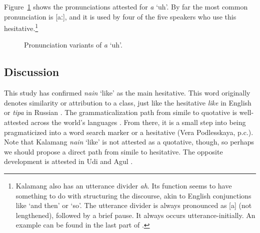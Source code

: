 \documentclass[output=paper,colorlinks,citecolor=brown
\ChapterDOI{10.5281/zenodo.15697587}
]{langscibook}
\begin{document}
Figure~\ref{fig:hesehpron} shows the pronunciations attested for \textit{a} `uh'. By far the most common pronunciation is [aː], and it is used by four of the five speakers who use this hesitative.\footnote{Kalamang also has an utterance divider \textit{ah}. Its function seems to have something to do with structuring the discourse, akin to English conjunctions like `and then' or `so'. The utterance divider is always pronounced as [a] (not lengthened), followed by a brief pause. It always occurs utterance-initially. An example can be found in the last part of .}

\begin{figure}[ht]
	\small
	\caption{Pronunciation variants of \textit{a} `uh'.}\label{fig:hesehpron}
\end{figure}

\subsection{Discussion}
This study has confirmed \textit{nain} `like' as the main hesitative. This word originally denotes similarity or attribution to a class, just like the hesitative \textit{like} in English \citep{laserna2014like} or \textit{tipa} in Russian \citep{egorova2018}. The grammaticalization path from simile to quotative is well-attested across the world's languages \citep[274]{heinekuteva2002}. From there, it is a small step into being pragmaticized into a word search marker or a hesitative  (Vera Podlesskaya, p.c.). Note that Kalamang \textit{nain} `like' is not attested as a quotative, though, so perhaps we should propose a direct path from simile to hesitative. The opposite development is attested in Udi and Agul \citep[111]{ganenkovetal2010}. 
\end{document}
